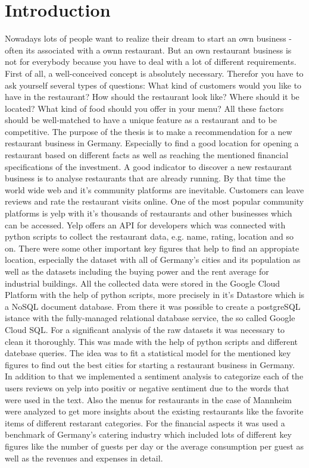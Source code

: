 \section{Introduction}
\label{sec:introduction}
Nowadays lots of people want to realize their dream to start an own business - often its associated with a ownn restaurant. But an own restaurant business is not for everybody because you have to deal with a lot of different requirements. First of all, a well-conceived concept is absolutely necessary. Therefor you have to ask yourself several types of questions: What kind of customers would you like to have in the restaurant? How should the restaurant look like? Where should it be located? What kind of food should you offer in your menu? All these factors should be well-matched to have a unique feature as a restaurant and to be competitive.
The purpose of the thesis is to make a recommendation for a new restaurant business in Germany. Especially to find a good location for opening a restaurant based on different facts as well as reaching the mentioned financial specifications of the investment.
A good indicator to discover a new restaurant business is to analyse restaurants that are already running. By that time the world wide web and it's community platforms are inevitable. Customers can leave reviews and rate the restaurant visits online. One of the most popular community platforms is yelp with it's thousands of restaurants and other businesses which can be accessed. Yelp offers an API for developers which was connected with python scripts to collect the restaurant data, e.g. name, rating, location and so on. There were some other important key figures that help to find an appropiate location, especially the dataset with all of Germany's cities and its population as well as the datasets including the buying power and the rent average for industrial buildings. All the collected data were stored in the Google Cloud Platform with the help of python scripts, more precisely in it's Datastore which is a NoSQL document database. From there it was possible to create a postgreSQL istance with the fully-managed relational database service, the so called Google Cloud SQL. For a significant analysis of the raw datasets it was necessary to clean it thoroughly. This was made with the help of python scripts and different datebase queries. The idea was to fit a statistical model for the mentioned key figures to find out the best cities for starting a restaurant business in Germany. In addition to that we implemented a sentiment analysis to categorize each of the users reviews on yelp into positiv or negative sentiment due to the words that were used in the text. Also the menus for restaurants in the case of Mannheim were analyzed to get more insights about the existing restaurants like the favorite items of different restarant categories. For the financial aspects it was used a benchmark of Germany's catering industry which included lots of different key figures like the number of guests per day or the average consumption per guest as well as the revenues and expenses in detail.